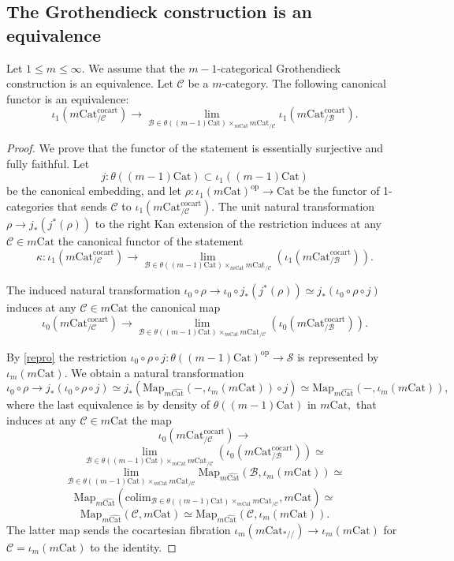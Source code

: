 \documentclass[10pt,oneside]{article}
\numberwithin{equation}{section} %
\numberwithin{figure}{section} %
\theoremstyle{plain}
\theoremstyle{definition}
\newcommand{\mB}{{\mathcal B}}
\newcommand{\mC}{{\mathcal C}}
\newcommand{\mS}{{\mathcal S}}
\newcommand{\bj}{{j}}
\newcommand{\m}{{m}}
\newcommand{\op}{\mathrm{op}}
\newcommand{\colim}{\mathrm{colim}}
\newcommand{\Cat}{\mathrm{Cat}}
\newcommand{\cocart}{{\mathrm{cocart}}}
\newcommand{\Map}{{\mathrm{Map}}}
\begin{document}
\subsection{The Grothendieck construction is an equivalence}

\begin{proposition}\label{Grothe}

Let $1 \leq \m \leq \infty.$
We assume that the $m-1$-categorical Grothendieck construction is an equivalence.
Let $\mC$ be a $m$-category.
The following canonical functor is an equivalence:
$$\iota_1(m\Cat^\cocart_{/\mC}) \to \lim_{\mB \in \theta((m-1)\Cat) \times_{m\Cat} m\Cat_{/\mC}} \iota_1(m\Cat^\cocart_{/\mB}).$$
    
\end{proposition}

\begin{proof}

We prove that the functor of the statement is essentially surjective and fully faithful.
Let $$\bj:  \theta((m-1)\Cat) \subset \iota_1((m-1)\Cat)$$ be the canonical embedding, and let $\rho: \iota_1(m\Cat)^\op \to \Cat$ be the functor of 1-categories that sends $\mC$ to $\iota_1(m\Cat^\cocart_{/\mC})$.	
The unit natural transformation $\rho \to \bj_*(\bj^*(\rho)) $ to the right Kan extension of the restriction
induces at any $\mC \in m\Cat$ the canonical functor of the statement
$$\kappa: \iota_1(m\Cat^\cocart_{/\mC}) \to \lim_{\mB \in \theta((m-1)\Cat) \times_{m\Cat} m\Cat_{/\mC}}(\iota_1(m\Cat^\cocart_{/\mB})).$$

The induced natural transformation $\iota_0 \circ \rho \to \iota_0 \circ \bj_*(\bj^*(\rho)) \simeq \bj_*(\iota_0 \circ  \rho \circ \bj) $ induces at any $\mC \in m\Cat$ the canonical map 
$$\iota_0(m\Cat^\cocart_{/\mC}) \to \lim_{\mB \in \theta((m-1)\Cat) \times_{m\Cat} m\Cat_{/\mC}}(\iota_0(m\Cat^\cocart_{/\mB})). $$

By \cref{repro} the restriction $\iota_0 \circ \rho \circ \bj: \theta((m-1)\Cat)^\op \to \mS$ is represented by $\iota_m(m\Cat)$.
We obtain a natural transformation $$\iota_0 \circ \rho \to \bj_*(\iota_0 \circ  \rho \circ \bj) \simeq \bj_*(\Map_{\m\widehat{\Cat}}(- , \iota_m(m\Cat))\circ \bj) \simeq  \Map_{\m\widehat{\Cat}}(- , \iota_m(m\Cat)), $$ where the last equivalence is by density of
$\theta((m-1)\Cat)$ in $m\Cat,$
that induces at any $\mC \in m\Cat$ the map
$$\iota_0(m\Cat^\cocart_{/\mC}) \to $$$$ \lim_{\mB \in \theta((m-1)\Cat) \times_{m\Cat} m\Cat_{/\mC}}(\iota_0(m\Cat^\cocart_{/\mB})) \simeq $$$$ \lim_{\mB \in \theta((m-1)\Cat) \times_{m\Cat} m\Cat_{/\mC}}\Map_{\m\widehat{\Cat}}(\mB,  \iota_m(m\Cat))\simeq $$
$$ \Map_{\m\widehat{\Cat}}(\colim_{\mB \in \theta((m-1)\Cat) \times_{m\Cat} m\Cat_{/\mC}}, m\Cat) \simeq $$$$ \Map_{\m\widehat{\Cat}}(\mC,  m\Cat) \simeq \Map_{\m\widehat{\Cat}}(\mC,  \iota_m(m\Cat)). $$ 
The latter map sends the cocartesian fibration 
$  \iota_m(m\Cat_{*//}) \to  \iota_m(m\Cat) $ for $\mC= \iota_m(m\Cat)$ to the identity.


\end{proof}
\end{document}
